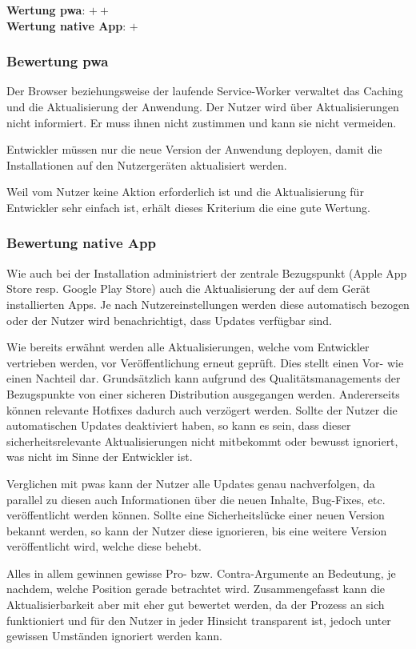 \textbf{Wertung \ac{pwa}}: $++$ \\
\textbf{Wertung native App}: $+$ \\

\subsubsection{Bewertung \ac{pwa}}
Der Browser beziehungsweise der laufende Service-Worker verwaltet das Caching und die Aktualisierung der Anwendung. Der Nutzer wird über Aktualisierungen nicht informiert. Er muss ihnen nicht zustimmen und kann sie nicht vermeiden. 

Entwickler müssen nur die neue Version der Anwendung deployen, damit die Installationen auf den Nutzergeräten aktualisiert werden.

Weil vom Nutzer keine Aktion erforderlich ist und die Aktualisierung für Entwickler sehr einfach ist, erhält dieses Kriterium die eine gute Wertung.

\subsubsection{Bewertung native App}
Wie auch bei der Installation administriert der zentrale Bezugspunkt (Apple App Store resp. Google Play Store) auch die Aktualisierung der auf dem Gerät installierten Apps. Je nach Nutzereinstellungen werden diese automatisch bezogen oder der Nutzer wird benachrichtigt, dass Updates verfügbar sind.

Wie bereits erwähnt werden alle Aktualisierungen, welche vom Entwickler vertrieben werden, vor Veröffentlichung erneut geprüft. Dies stellt einen Vor- wie einen Nachteil dar. Grundsätzlich kann aufgrund des Qualitätsmanagements der Bezugspunkte von einer sicheren Distribution ausgegangen werden. Andererseits können relevante Hotfixes dadurch auch verzögert werden. Sollte der Nutzer die automatischen Updates deaktiviert haben, so kann es sein, dass dieser sicherheitsrelevante Aktualisierungen nicht mitbekommt oder bewusst ignoriert, was nicht im Sinne der Entwickler ist.

Verglichen mit \acp{pwa} kann der Nutzer alle Updates genau nachverfolgen, da parallel zu diesen auch Informationen über die neuen Inhalte, Bug-Fixes, etc. veröffentlicht werden können. Sollte eine Sicherheitslücke einer neuen Version bekannt werden, so kann der Nutzer diese ignorieren, bis eine weitere Version veröffentlicht wird, welche diese behebt.

Alles in allem gewinnen gewisse Pro- bzw. Contra-Argumente an Bedeutung, je nachdem, welche Position gerade betrachtet wird. Zusammengefasst kann die Aktualisierbarkeit aber mit eher gut bewertet werden, da der Prozess an sich funktioniert und für den Nutzer in jeder Hinsicht transparent ist, jedoch unter gewissen Umständen ignoriert werden kann.